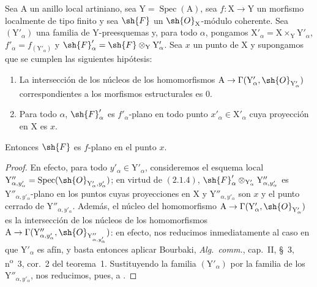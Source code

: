 \begin{corollary}[11.4.13]
\label{IV.11.4.13}
Sea $\mathrm{A}$ un anillo local artiniano, sea $\mathrm{Y}=\operatorname{Spec}(\mathrm{A})$, sea $f:\mathrm{X}\to\mathrm{Y}$ un
morfismo localmente de tipo finito y sea $\sh{F}$ un $\sh{O}_\mathrm{X}$-módulo coherente. Sea $(\mathrm{Y}'_\alpha)$ una familia de
$\mathrm{Y}$-preesquemas y, para todo $\alpha$, pongamos $\mathrm{X}'_\alpha=\mathrm{X}\times_\mathrm{Y}\mathrm{Y}'_\alpha$, $f'_\alpha=f_{(\mathrm{Y}'_\alpha)}$ y $\sh{F}'_\alpha=\sh{F}\otimes_\mathrm{Y}\mathrm{Y}'_\alpha$. Sea $x$ un punto
de $\mathrm{X}$ y supongamos que se cumplen las siguientes hipótesis:
\begin{enumerate}[label=(\roman*)]
  \item La intersección de los núcleos de los homomorfismos $\mathrm{A}\to\Gamma(\mathrm{Y}'_\alpha,\sh{O}_{\mathrm{Y}'_\alpha})$ correspondientes a los
  morfismos estructurales es $0$.
  \item Para todo $\alpha$, $\sh{F}'_\alpha$ es $f'_\alpha$-plano en todo punto $x'_\alpha\in\mathrm{X}'_\alpha$ cuya proyección en $\mathrm{X}$ es $x$.
\end{enumerate}

Entonces $\sh{F}$ es $f$-plano en el punto $x$.
\end{corollary}

\begin{proof}
En efecto, para todo $y'_\alpha\in\mathrm{Y}'_\alpha$, consideremos el esquema local
$\mathrm{Y}''_{\alpha,y'_\alpha}=\operatorname{Spec}(\sh{O}_{\mathrm{Y}'_\alpha,y'_\alpha})$; en
virtud de $(2.1.4)$, $\sh{F}'_\alpha\otimes_{\mathrm{Y}'_\alpha}\mathrm{Y}''_{\alpha,y'_\alpha}$ es
$\mathrm{Y}''_{\alpha,y'_\alpha}$-plano en los puntos cuyas proyecciones en $\mathrm{X}$ y
$\mathrm{Y}''_{\alpha,y'_\alpha}$ son $x$ y el punto cerrado de $\mathrm{Y}''_{\alpha,y'_\alpha}$.
Además, el núcleo del homomorfismo
$\mathrm{A}\to\Gamma(\mathrm{Y}'_\alpha,\sh{O}_{\mathrm{Y}'_\alpha})$ es la intersección de los núcleos de los homomorfismos
$\mathrm{A}\to\Gamma(\mathrm{Y}''_{\alpha,y'_\alpha},\sh{O}_{\mathrm{Y}''_{\alpha,y'_\alpha}})$:
en efecto, nos reducimos inmediatamente al caso en que $\mathrm{Y}'_\alpha$ es afín, y basta entonces aplicar Bourbaki, \emph{Alg.\ comm.},
cap.~II, \S~3, n\textsuperscript{o}~3, cor.~2 del teorema~1. Sustituyendo la familia $(\mathrm{Y}'_\alpha)$ por la familia de los $\mathrm{Y}''_{\alpha,y'_\alpha}$,
nos reducimos, pues, a .
\end{proof}

